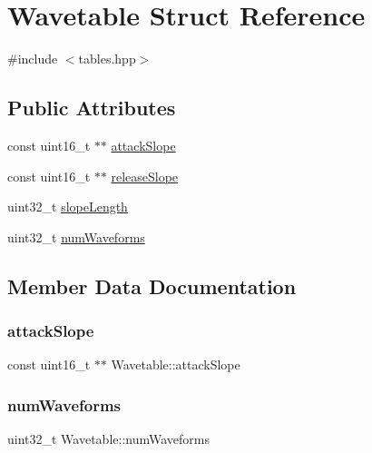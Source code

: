 \hypertarget{struct_wavetable}{}\section{Wavetable Struct Reference}
\label{struct_wavetable}


{\ttfamily \#include $<$tables.\+hpp$>$}

\subsection*{Public Attributes}
\begin{DoxyCompactItemize}
\item 
const uint16\+\_\+t $\ast$$\ast$ \mbox{\hyperlink{struct_wavetable_a5bbf27a67538bb22af77a4617f238298}{attack\+Slope}}
\item 
const uint16\+\_\+t $\ast$$\ast$ \mbox{\hyperlink{struct_wavetable_ae48a196c95975321df7095d454ffe18e}{release\+Slope}}
\item 
uint32\+\_\+t \mbox{\hyperlink{struct_wavetable_a59998c0be95e8630d258c4e0f7ba030e}{slope\+Length}}
\item 
uint32\+\_\+t \mbox{\hyperlink{struct_wavetable_a122cae720c6ba44a73e17e44c47f048e}{num\+Waveforms}}
\end{DoxyCompactItemize}


\subsection{Member Data Documentation}
\mbox{\label{struct_wavetable_a5bbf27a67538bb22af77a4617f238298}} 
\subsubsection{\texorpdfstring{attack\+Slope}{attackSlope}}
{\footnotesize\ttfamily const uint16\+\_\+t $\ast$$\ast$ Wavetable\+::attack\+Slope}

\mbox{\label{struct_wavetable_a122cae720c6ba44a73e17e44c47f048e}} 
\subsubsection{\texorpdfstring{num\+Waveforms}{numWaveforms}}
{\footnotesize\ttfamily uint32\+\_\+t Wavetable\+::num\+Waveforms}

